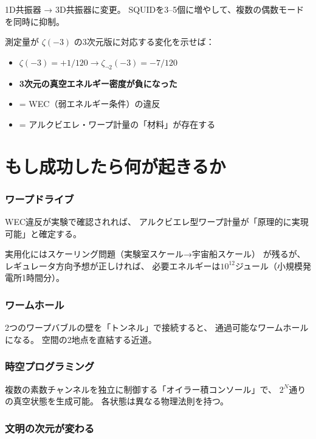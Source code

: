 \documentclass[12pt,a4paper]{article}
\begin{document}
\begin{physbox}[第2段階の実験（+50万円）]
1D共振器 → 3D共振器に変更。
SQUIDを3--5個に増やして、複数の偶数モードを同時に抑制。

測定量が $\zeta(-3)$ の3次元版に対応する変化を示せば：
\begin{itemize}
\item $\zeta(-3) = +1/120 \to \zeta_{\neg 2}(-3) = -7/120$
\item \textbf{3次元の真空エネルギー密度が負になった}
\item = WEC（弱エネルギー条件）の違反
\item = アルクビエレ・ワープ計量の「材料」が存在する
\end{itemize}
\end{physbox}

\part{もし成功したら何が起きるか}

\section{ワープドライブ}

WEC違反が実験で確認されれば、
アルクビエレ型ワープ計量が「原理的に実現可能」と確定する。

実用化にはスケーリング問題（実験室スケール→宇宙船スケール）
が残るが、レギュレータ方向予想が正しければ、
必要エネルギーは$10^{12}$ジュール（小規模発電所1時間分）。

\section{ワームホール}

2つのワープバブルの壁を「トンネル」で接続すると、
通過可能なワームホールになる。
空間の2地点を直結する近道。

\section{時空プログラミング}

複数の素数チャンネルを独立に制御する「オイラー積コンソール」で、
$2^N$通りの真空状態を生成可能。
各状態は異なる物理法則を持つ。

\section{文明の次元が変わる}
\end{document}
